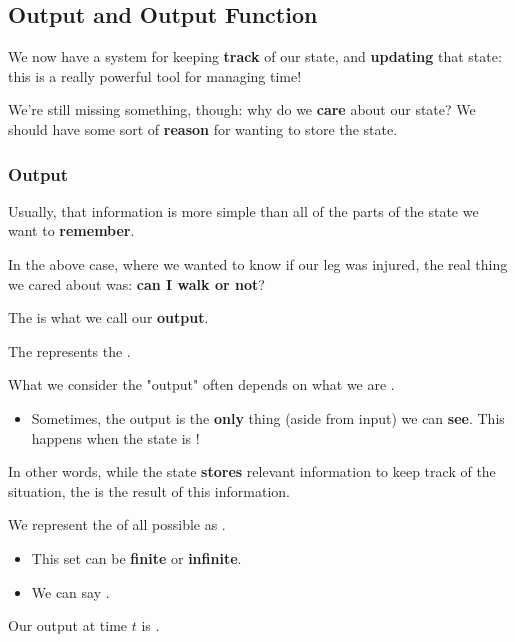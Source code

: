     \secdiv

    \subsection{Output and Output Function}
    
        We now have a system for keeping \textbf{track} of our state, and \textbf{updating} that state: this is a really powerful tool for managing time!
        
        We're still missing something, though: why do we \textbf{care} about our state? We should have some sort of \textbf{reason} for wanting to store the state. 
        
        \subsubsection{Output}
        
            Usually, that information is more simple than all of the parts of the state we want to \textbf{remember}.
            
            \miniex In the above case, where we wanted to know if our leg was injured, the real thing we cared about was: \textbf{can I walk or not}?
            
            The is what we call our \textbf{output}.\\
            
            \begin{definition}
                The   represents the . 
                
                What we consider the "output" often depends on what we are .
                
                    \begin{itemize}
                        \item Sometimes, the output is the \textbf{only} thing (aside from input) we can \textbf{see}. This happens when the state is !
                    \end{itemize}
                
                In other words, while the state \textbf{stores} relevant information to keep track of the situation, the  is the result of this information.
                
                We represent the  of all possible  as .
                
                \begin{itemize}
                    \item This set can be \textbf{finite} or \textbf{infinite}.
                    \item We can say .
                \end{itemize}
                    
                Our output at time $t$ is .
            \end{definition}

